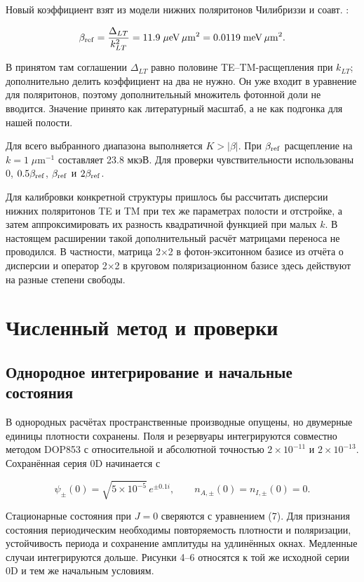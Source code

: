 \documentclass[12pt,a4paper]{article}
\begin{document}
Новый коэффициент взят из модели нижних поляритонов Чилибриззи и соавт. \cite{ref6}:

\[
\beta_{\rm ref}=\frac{\Delta_{LT}}{k_{LT}^2}
=11.9\;\mu\mathrm{eV}\,\mu\mathrm m^2
=0.0119\;\mathrm{meV}\,\mu\mathrm m^2.
\]

В принятом там соглашении \(\Delta_{LT}\) равно половине TE--TM-расщепления при \(k_{LT}\); дополнительно делить коэффициент на два не нужно. Он уже входит в уравнение для поляритонов, поэтому дополнительный множитель фотонной доли не вводится. Значение принято как литературный масштаб, а не как подгонка для нашей полости.

Для всего выбранного диапазона выполняется \(K>|\beta|\). При \(\beta_{\rm ref}\) расщепление на \(k=1\;\mu\mathrm m^{-1}\) составляет 23.8 мкэВ. Для проверки чувствительности использованы \(0\), \(0.5\beta_{\rm ref}\), \(\beta_{\rm ref}\) и \(2\beta_{\rm ref}\).

Для калибровки конкретной структуры пришлось бы рассчитать дисперсии нижних поляритонов TE и TM при тех же параметрах полости и отстройке, а затем аппроксимировать их разность квадратичной функцией при малых \(k\). В настоящем расширении такой дополнительный расчёт матрицами переноса не проводился. В частности, матрица 2×2 в фотон-экситонном базисе из отчёта о дисперсии и оператор 2×2 в круговом поляризационном базисе здесь действуют на разные степени свободы.

\section{Численный метод и проверки}

\subsection{Однородное интегрирование и начальные состояния}

В однородных расчётах пространственные производные опущены, но двумерные единицы плотности сохранены. Поля и резервуары интегрируются совместно методом DOP853 с относительной и абсолютной точностью \(2\times10^{-11}\) и \(2\times10^{-13}\). Сохранённая серия 0D начинается с

\[
\psi_\pm(0)=\sqrt{5\times10^{-5}}\,e^{\pm0.1i},\qquad
n_{A,\pm}(0)=n_{I,\pm}(0)=0.
\]

Стационарные состояния при \(J=0\) сверяются с уравнением (7). Для признания состояния периодическим необходимы повторяемость плотности и поляризации, устойчивость периода и сохранение амплитуды на удлинённых окнах. Медленные случаи интегрируются дольше. Рисунки 4--6 относятся к той же исходной серии 0D и тем же начальным условиям.
\end{document}
